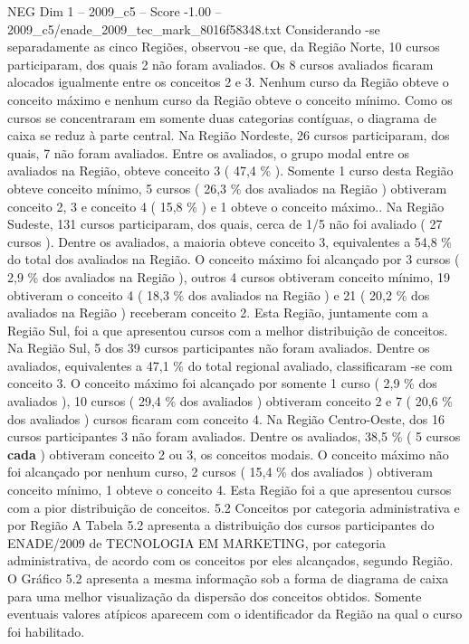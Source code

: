 \begin{textsample}{NEG Dim 1 – 2009\_c5 – Score -1.00 – 2009\_c5/enade\_2009\_tec\_mark\_8016f58348.txt}
Considerando -se separadamente as cinco Regiões, observou -se que, da Região Norte, 10 cursos participaram, dos quais 2 não foram avaliados.
Os 8 cursos avaliados ficaram alocados igualmente entre os conceitos 2 e 3.
Nenhum curso da Região obteve o conceito máximo e nenhum curso da Região obteve o conceito mínimo.
Como os cursos se concentraram em somente duas categorias contíguas, o diagrama de caixa se reduz à parte central.
Na Região Nordeste, 26 cursos participaram, dos quais, 7 não foram avaliados.
Entre os avaliados, o grupo modal entre os avaliados na Região, obteve conceito 3 ( 47,4 \% ).
Somente 1 curso desta Região obteve conceito mínimo, 5 cursos ( 26,3 \% dos avaliados na Região ) obtiveram conceito 2, 3 e conceito 4 ( 15,8 \% ) e 1 obteve o conceito máximo..
Na Região Sudeste, 131 cursos participaram, dos quais, cerca de 1/5 não foi avaliado ( 27 cursos ).
Dentre os avaliados, a maioria obteve conceito 3, equivalentes a 54,8 \% do total dos avaliados na Região.
O conceito máximo foi alcançado por 3 cursos ( 2,9 \% dos avaliados na Região ), outros 4 cursos obtiveram conceito mínimo, 19 obtiveram o conceito 4 ( 18,3 \% dos avaliados na Região ) e 21 ( 20,2 \% dos avaliados na Região ) receberam conceito 2.
Esta Região, juntamente com a Região Sul, foi a que apresentou cursos com a melhor distribuição de conceitos.
Na Região Sul, 5 dos 39 cursos participantes não foram avaliados.
Dentre os avaliados, equivalentes a 47,1 \% do total regional avaliado, classificaram -se com conceito 3.
O conceito máximo foi alcançado por somente 1 curso ( 2,9 \% dos avaliados ), 10 cursos ( 29,4 \% dos avaliados ) obtiveram conceito 2 e 7 ( 20,6 \% dos avaliados ) cursos ficaram com conceito 4.
Na Região Centro-Oeste, dos 16 cursos participantes 3 não foram avaliados.
Dentre os avaliados, 38,5 \% ( 5 cursos \textbf{cada} ) obtiveram conceito 2 ou 3, os conceitos modais.
O conceito máximo não foi alcançado por nenhum curso, 2 cursos ( 15,4 \% dos avaliados ) obtiveram conceito mínimo, 1 obteve o conceito 4.
Esta Região foi a que apresentou cursos com a pior distribuição de conceitos. 5.2 Conceitos por categoria administrativa e por Região A Tabela 5.2 apresenta a distribuição dos cursos participantes do ENADE/2009 de TECNOLOGIA EM MARKETING, por categoria administrativa, de acordo com os conceitos por eles alcançados, segundo Região.
O Gráfico 5.2 apresenta a mesma informação sob a forma de diagrama de caixa para uma melhor visualização da dispersão dos conceitos obtidos.
Somente eventuais valores atípicos aparecem com o identificador da Região na qual o curso foi habilitado.

\end{textsample}

